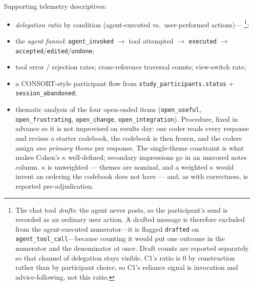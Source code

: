 \documentclass[11pt]{article}
\newcommand{\code}[1]{\texttt{#1}}
\begin{document}
Supporting telemetry descriptives:
\begin{itemize}[nosep]
  \item \emph{delegation ratio} by condition (agent-executed vs.\ user-performed
  actions)---%
  \footnote{The chat tool \emph{drafts}: the agent never posts, so the
  participant's send is recorded as an ordinary user action. A drafted message is
  therefore excluded from the agent-executed numerator---it is flagged
  \code{drafted} on \code{agent\_tool\_call}---because counting it would put one
  outcome in the numerator and the denominator at once. Draft counts are reported
  separately so that channel of delegation stays visible. C1's ratio is $0$ by
  construction rather than by participant choice, so C1's reliance signal is
  invocation and advice-following, not this ratio.};
  \item the \emph{agent funnel}: \code{agent\_invoked} $\rightarrow$ tool attempted $\rightarrow$ \code{executed} $\rightarrow$ \code{accepted}/\code{edited}/\code{undone};
  \item tool error / rejection rates; cross-reference traversal counts; view-switch rate;
  \item a CONSORT-style participant flow from \code{study\_participants.status} $+$ \code{session\_abandoned};
  \item thematic analysis of the four open-ended items (\code{open\_useful},
  \code{open\_frustrating}, \code{open\_change}, \code{open\_integration}).
  Procedure, fixed in advance so it is not improvised on results day: one coder
  reads every response and revises a starter codebook, the codebook is then
  frozen, and the coders assign \emph{one primary theme} per
  response. The single-theme constraint is what makes Cohen's $\kappa$
  well-defined; secondary impressions go in an unscored notes column. $\kappa$ is
  unweighted --- themes are nominal, and a weighted $\kappa$ would invent an
  ordering the codebook does not have --- and, as with correctness, is reported
  pre-adjudication.


\end{itemize}
\end{document}
